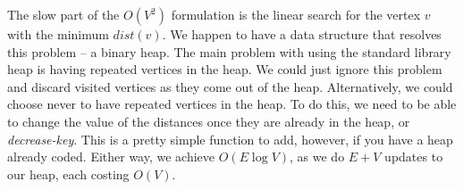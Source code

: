 \documentclass[11pt]{book}
\begin{document}
\begin{center}
\end{center}

The slow part of the $O(V^2)$ formulation is the linear search for the vertex $v$ with the minimum $dist(v)$. We happen to have a data structure that resolves this problem -- a binary heap. The main problem with using the standard library heap is having repeated vertices in the heap. We could just ignore this problem and discard visited vertices as they come out of the heap. Alternatively, we could choose never to have repeated vertices in the heap. To do this, we need to be able to change the value of the distances once they are already in the heap, or \textit{decrease-key}. This is a pretty simple function to add, however, if you have a heap already coded. Either way, we achieve $O(E \log{V})$, as we do $E+V$ updates to our heap, each costing $O(V)$.
\end{document}
